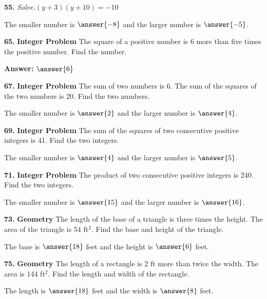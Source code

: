 \documentclass{ximera}
\begin{document}
\begin{problem}
\textbf{55.} \emph{Solve.}\quad $(y + 3)(y + 10) = -10$

The smaller number is $\answer{-8}$ and the larger number is $\answer{-5}$.
\end{problem}

\begin{problem}
\textbf{65.} \textbf{Integer Problem} The square of a positive number is 6 more than five times
  the positive number. Find the number.

\textbf{Answer:} $\answer{6}$
\end{problem}

\begin{problem}
\textbf{67.} \textbf{Integer Problem} The sum of two numbers is 6. The sum of the squares of
  the two numbers is 20. Find the two numbers.

The smaller number is $\answer{2}$ and the larger number is $\answer{4}$.
\end{problem}

\begin{problem}
\textbf{69.} \textbf{Integer Problem} The sum of the squares of two consecutive positive
  integers is 41. Find the two integers.

The smaller number is $\answer{4}$ and the larger number is $\answer{5}$.
\end{problem}

\begin{problem}
\textbf{71.} \textbf{Integer Problem} The product of two consecutive positive integers is 240.
  Find the two integers.

The smaller number is $\answer{15}$ and the larger number is $\answer{16}$.
\end{problem}

\begin{problem}
\textbf{73.} \textbf{Geometry} The length of the base of a triangle is three times the height.
  The area of the triangle is 54 ft$^2$. Find the base and height of the triangle.

The base is $\answer{18}$ feet and the height is $\answer{6}$ feet.
\end{problem}

\begin{problem}
\textbf{75.} \textbf{Geometry} The length of a rectangle is 2 ft more than twice the width. The
  area is 144 ft$^2$. Find the length and width of the rectangle.

The length is $\answer{18}$ feet and the width is $\answer{8}$ feet.
\end{problem}
\end{document}
